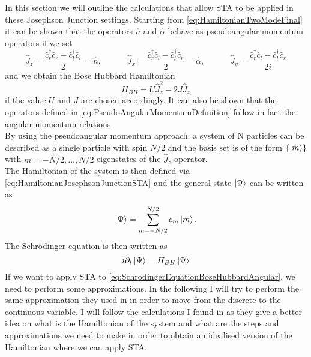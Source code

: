 In this section we will outline the calculations that allow STA to be applied in these Josephson Junction settings.
Starting from \cref{eq:HamiltonianTwoModeFinal} it can be shown that the operators $ \hat{n} $ and $ \hat{ \alpha } $ behave as pseudoangular momentum operators if we set
\begin{equation}
	\label{eq:PseudoAngularMomentumDefinition}
	\hat{J}_z = \frac{\hat{c}_{r}^{\dagger}\hat{c}_{r} - \hat{c}_{l}^{\dagger}\hat{c}_{l}}{2} = \hat{n},\hspace{3em} \hat{J}_x =\frac{\hat{c}_{r}^{\dagger}\hat{c}_{l} - \hat{c}_{l}^{\dagger}\hat{c}_{r}}{2} =  \hat{ \alpha }  ,\hspace{3em}  \hat{J}_y = \frac{\hat{c}_{r}^{\dagger}\hat{c}_{l} - \hat{c}_{l}^{\dagger}\hat{c}_{r}}{2i}
\end{equation}
and we obtain the Bose Hubbard Hamiltonian
\begin{equation}
	\label{eq:HamiltonianJosephsonJunctionSTA}
	H_{BH} =  U \hat{J}_z^2 - 2J\hat{J}_x
\end{equation}
if the value $ U $ and $ J $ are chosen accordingly.
It can also be shown that the operators defined in \cref{eq:PseudoAngularMomentumDefinition} follow in fact the angular momentum relations.\\
By using the pseudoangular momentum approach, a system of N particles can be described as a single particle with spin $ N/2 $ and the basis set is of the form $ \{\ket{m}\} $ with $ m = -N/2, ..., N/2 $ eigenstates of the $ \hat{J}_{z} $ operator.\\
The Hamiltonian of the system is then defined via \cref{eq:HamiltonianJosephsonJunctionSTA} and the general state $ \ket{\Psi} $ can be written as
\begin{equation}
	\label{eq:GeneralStateAngularMomentum}
	\ket{\Psi} = \sum_{m = -N/2}^{N/2} c_{m}\ket{m}.
\end{equation}
The Schr{\"o}dinger equation is then written as
\begin{equation}
	\label{eq:SchrodingerEquationBoseHubbardAngular}
	i\partial_t \ket{\Psi} = H_{BH}\ket{\Psi}
\end{equation}
If we want to apply STA to \cref{eq:SchrodingerEquationBoseHubbardAngular}, we need to perform some approximations.
In the following I will try to perform the same approximation they used in \cite{BoseEinsteinCJulia2010} in order to move from the discrete to the continuous variable.
I will follow the calculations I found in \cite{BoseEinsteinCJulia2010} as they give a better idea on what is the Hamiltonian of the system and what are the steps and approximations we need to make in order to obtain an idealised version of the Hamiltonian where we can apply STA.

